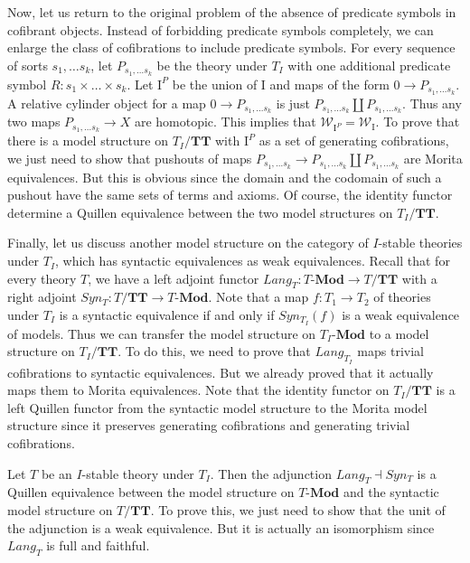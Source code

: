\documentclass[reqno]{amsart}
\theoremstyle{definition}
\theoremstyle{remark}
\newcommand{\cat}[1]{\mathbf{#1}}
\newcommand{\Mod}[1]{#1\text{-}\cat{Mod}}
\newcommand{\algtt}{\cat{TT}}
\newcommand{\we}{\mathcal{W}}
\newcommand{\I}{\mathrm{I}}
\numberwithin{figure}{section}
\begin{document}
Now, let us return to the original problem of the absence of predicate symbols in cofibrant objects.
Instead of forbidding predicate symbols completely, we can enlarge the class of cofibrations to include predicate symbols.
For every sequence of sorts $s_1, \ldots s_k$, let $P_{s_1, \ldots s_k}$ be the theory under $T_I$ with one additional predicate symbol $R : s_1 \times \ldots \times s_k$.
Let $\I^P$ be the union of $\I$ and maps of the form $0 \to P_{s_1, \ldots s_k}$.
A relative cylinder object for a map $0 \to P_{s_1, \ldots s_k}$ is just $P_{s_1, \ldots s_k} \amalg P_{s_1, \ldots s_k}$.
Thus any two maps $P_{s_1, \ldots s_k} \to X$ are homotopic.
This implies that $\we_{\I^P} = \we_\I$.
To prove that there is a model structure on $T_I/\algtt$ with $\I^P$ as a set of generating cofibrations,
we just need to show that pushouts of maps $P_{s_1, \ldots s_k} \to P_{s_1, \ldots s_k} \amalg P_{s_1, \ldots s_k}$ are Morita equivalences.
But this is obvious since the domain and the codomain of such a pushout have the same sets of terms and axioms.
Of course, the identity functor determine a Quillen equivalence between the two model structures on $T_I/\algtt$.

Finally, let us discuss another model structure on the category of $I$-stable theories under $T_I$, which has syntactic equivalences as weak equivalences.
Recall that for every theory $T$, we have a left adjoint functor $Lang_T : \Mod{T} \to T/\algtt$ with a right adjoint $Syn_T : T/\algtt \to \Mod{T}$.
Note that a map $f : T_1 \to T_2$ of theories under $T_I$ is a syntactic equivalence if and only if $Syn_{T_I}(f)$ is a weak equivalence of models.
Thus we can transfer the model structure on $\Mod{T_I}$ to a model structure on $T_I/\algtt$.
To do this, we need to prove that $Lang_{T_I}$ maps trivial cofibrations to syntactic equivalences.
But we already proved that it actually maps them to Morita equivalences.
Note that the identity functor on $T_I/\algtt$ is a left Quillen functor from the syntactic model structure to the Morita model structure
since it preserves generating cofibrations and generating trivial cofibrations.

Let $T$ be an $I$-stable theory under $T_I$.
Then the adjunction $Lang_T \dashv Syn_T$ is a Quillen equivalence between the model structure on $\Mod{T}$ and the syntactic model structure on $T/\algtt$.
To prove this, we just need to show that the unit of the adjunction is a weak equivalence.
But it is actually an isomorphism since $Lang_T$ is full and faithful.
\end{document}
